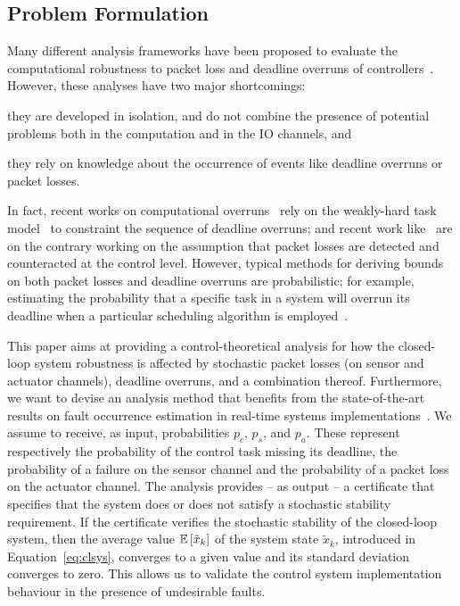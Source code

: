 \subsection{Problem Formulation}%
\label{sec:prob}%
Many different analysis frameworks have been proposed to evaluate the computational robustness to packet loss and deadline overruns of controllers~\cite{Ghosh:2018, Maggio:2020, Linsenmayer:2017, Heemels:2011}.
However, these analyses have two major shortcomings:
\begin{enumerate*}[label=(\roman*)]
    \item they are developed in isolation, and do not combine the presence of potential problems both in the computation and in the IO channels, and
    \item they rely on knowledge about the occurrence of events like deadline overruns or packet losses.
\end{enumerate*}
In fact, recent works on computational overruns~\cite{Maggio:2020, Linsenmayer:2017} rely on the weakly-hard task model~\cite{Bernat:2001} to constraint the sequence of deadline overruns; and recent work like~\cite{Ghosh:2018} are on the contrary working on the assumption that packet losses are detected and counteracted at the control level.
However, typical methods for deriving bounds on both packet losses and deadline overruns are probabilistic; for example, estimating the probability that a specific task in a system will overrun its deadline when a particular scheduling algorithm is employed~\cite{Chen:2019, Bruggen:2021}.

This paper aims at providing a control-theoretical analysis for how the closed-loop system robustness is affected by stochastic packet losses (on sensor and actuator channels), deadline overruns, and a combination thereof.
Furthermore, we want to devise an analysis method that benefits from the state-of-the-art results on fault occurrence estimation in real-time systems implementations~\cite{Chen:2019, Bruggen:2021}.
We assume to receive, as input, probabilities $p_c$, $p_s$, and $p_a$.
These represent respectively the probability of the control task missing its deadline, the probability of a failure on the sensor channel and the probability of a packet loss on the actuator channel.
The analysis provides -- as output -- a certificate that specifies that the system does or does not satisfy a stochastic stability requirement.
If the certificate verifies the stochastic stability of the closed-loop system, then the average value $\mathbb{E}\left[ \tilde{x}_k \right]$ of the system state $\tilde{x}_k$, introduced in Equation~\eqref{eq:clsys}, converges to a given value and its standard deviation converges to zero.
This allows us to validate the control system implementation behaviour in the presence of undesirable faults.
